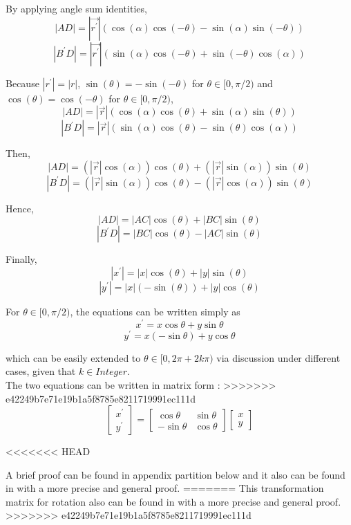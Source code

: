 By applying angle sum identities,
$$|AD| = |\vec{r^{'}}| (\cos(\alpha)\cos(-\theta) - \sin(\alpha)\sin(-\theta))$$
$$|B^{'}D| = |\vec{r^{'}}| (\sin(\alpha)\cos(-\theta) + \sin(-\theta)\cos(\alpha))$$

Because $|r^{'}| = |r|$, $\sin(\theta) = - \sin(-\theta)$ for $\theta \in [0, \pi/2)$ and $\cos(\theta) = \cos(-\theta)$ for $\theta \in [0, \pi/2)$,
$$|AD| = |\vec{r}| (\cos(\alpha)\cos(\theta) + \sin(\alpha)\sin(\theta))$$
$$|B^{'}D| = |\vec{r}| (\sin(\alpha)\cos(\theta) - \sin(\theta)\cos(\alpha))$$

Then,
$$|AD| = (|\vec{r}|\cos(\alpha))\cos(\theta) + (|\vec{r}|\sin(\alpha))\sin(\theta)$$
$$|B^{'}D| = (|\vec{r}|\sin(\alpha))\cos(\theta) - (|\vec{r}|\cos(\alpha))\sin(\theta)$$

Hence,
$$|AD| = |AC|\cos(\theta) + |BC|\sin(\theta)$$
$$|B^{'}D| = |BC|\cos(\theta) - |AC|\sin(\theta)$$

Finally,
$$|x^{'}| = |x|\cos(\theta) + |y|\sin(\theta)$$
$$|y^{'}| = |x|(- \sin(\theta)) + |y|\cos(\theta)$$

For $\theta \in [0, \pi/2)$, the equations can be written simply as
$$ x^{'} = x\cos\theta + y\sin\theta$$
$$ y^{'} = x(- \sin\theta) + y\cos\theta$$

which can be easily extended to $\theta \in [ 0, 2\pi + 2k\pi)$ via discussion under different cases, given that $k \in Integer$.\\

The two equations can be written in matrix form :
>>>>>>> e42249b7e71e19b1a5f8785e8211719991ec111d
\begin{equation} \label{Equ_ori}
  \begin{bmatrix}
   x^{'} \\ y^{'}
   \end{bmatrix} =   \begin{bmatrix}
      \cos\theta & \sin\theta \\
      -\sin\theta & \cos\theta
    \end{bmatrix} \begin{bmatrix}
      x \\ y
     \end{bmatrix}
\end{equation}

<<<<<<< HEAD
\par\noindent
A brief proof can be found in appendix partition below and it also can be found in \cite{Mitnote09} with a more precise and general proof.
=======
This transformation matrix for rotation also can be found in \cite{Mitnote09} with a more precise and general proof.
>>>>>>> e42249b7e71e19b1a5f8785e8211719991ec111d


